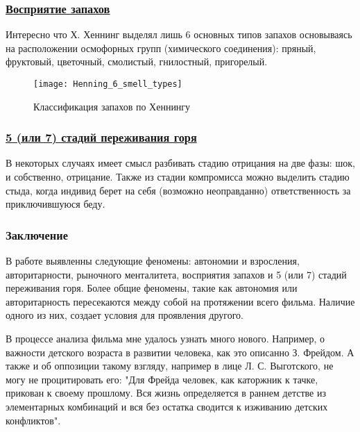 \documentclass[a4paper,12pt]{report} %
\begin{document}
\subsubsection{\underline{Восприятие запахов}}


Интересно что Х. Хеннинг выделял лишь 6 основных типов запахов основываясь на расположении осмофорных групп (химического соединения):  пряный, фруктовый, цветочный, смолистый, гнилостный, пригорелый.

\begin{figure}[!h]
	\centering
	\texttt{[image: Henning\_6\_smell\_types]}
	\caption{Классификация запахов по Хеннингу}
\end{figure}

\newpage

\subsubsection{\underline{5 (или 7) стадий переживания горя}}

В некоторых случаях имеет смысл разбивать стадию отрицания на две фазы: шок, и собственно, отрицание. Также из стадии компромисса можно выделить стадию стыда, когда индивид берет на себя (возможно неоправданно) ответственность за приключившуюся беду.



\subsubsection{Заключение}

В работе выявленны следующие феномены: автономии и взросления, авторитарности, рыночного менталитета, восприятия запахов и 5 (или 7) стадий переживания горя. Более общие феномены, такие как автономия или авторитарность пересекаются между собой на протяжении всего фильма. Наличие одного из них, создает условия для проявления другого. 

В процессе анализа фильма мне удалось узнать много нового.  Например, о важности детского возраста в развитии человека, как это описанно З. Фрейдом. А также и об оппозиции такому  взгляду, например в лице Л. С. Выготского, не могу не процитировать его: "Для Фрейда человек, как каторжник к тачке, прикован к своему прошлому. Вся жизнь определяется в раннем детстве из элементарных комбинаций и вся без остатка сводится к изживанию детских конфликтов". 
\end{document}
